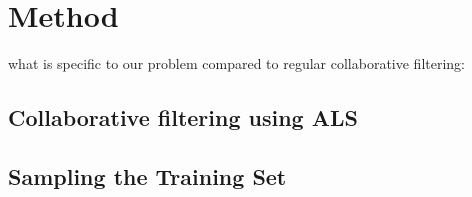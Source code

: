 \documentclass[10pt, conference, compsocconf]{IEEEtran}
\begin{document}





\section{Method}

what is specific to our problem compared to regular collaborative filtering:

\subsection{Collaborative filtering using ALS}




\subsection{Sampling the Training Set}
\end{document}
